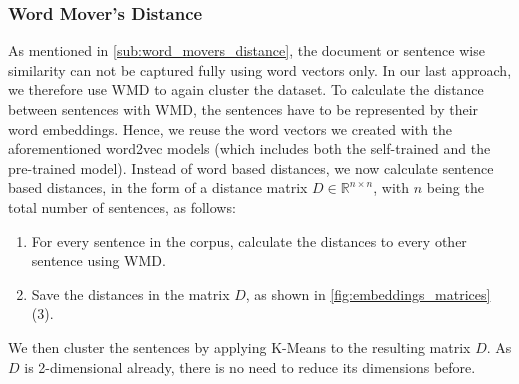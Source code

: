 \subsubsection{Word Mover's Distance} %
\label{sub:own_wmd}
As mentioned in \autoref{sub:word_movers_distance}, the document or sentence wise similarity can not be captured fully using word vectors only. In our last approach, we therefore use WMD to again cluster the dataset. To calculate the distance between sentences with WMD, the sentences have to be represented by their word embeddings. Hence, we reuse the word vectors we created with the aforementioned word2vec models (which includes both the self-trained and the pre-trained model). Instead of word based distances, we now calculate sentence based distances, in the form of a distance matrix $D\in\mathbb{R}^{n\times n}$, with $n$ being the total number of sentences, as follows:
\begin{enumerate}
	\item For every sentence in the \crowdre{} corpus, calculate the distances to every other sentence using WMD.
	\item Save the distances in the matrix $D$, as shown in \autoref{fig:embeddings_matrices} (3).
\end{enumerate}
We then cluster the sentences by applying K-Means to the resulting matrix $D$. 
As $D$ is 2-dimensional already, there is no need to reduce its dimensions before.